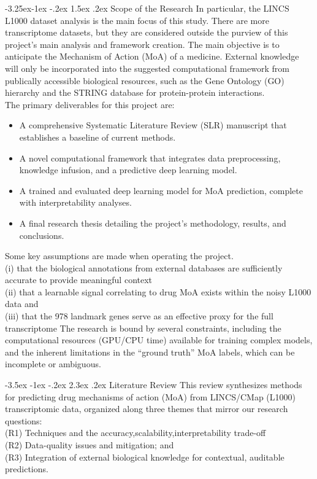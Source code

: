 \documentclass[12pt,a4paper]{article}
\makeatletter
\renewcommand\section{\@startsection{section}{1}{\z@}%
  {-3.5ex \@plus-1ex \@minus-.2ex}%
  {2.3ex \@plus.2ex}%
  {\normalfont\large\bfseries}}
\renewcommand\subsection{\@startsection{subsection}{2}{\z@}%
  {-3.25ex\@plus-1ex \@minus-.2ex}%
  {1.5ex \@plus.2ex}%
  {\normalfont\normalsize\bfseries}}
\makeatother
\begin{document}
\subsection{Scope of the Research}
In particular, the LINCS L1000 dataset analysis is the main focus of this study.  There are more transcriptome datasets, but they are considered outside the purview of this project's main analysis and framework creation. The main objective is to anticipate the Mechanism of Action (MoA) of a medicine.  External knowledge will only be incorporated into the suggested computational framework from publically accessible biological resources, such as the Gene Ontology (GO) hierarchy and the STRING database for protein-protein interactions.
\\
The primary deliverables for this project are:
\begin{itemize}
  \item A comprehensive Systematic Literature Review (SLR) manuscript that establishes a baseline of current methods.
  \item A novel computational framework that integrates data preprocessing, knowledge infusion, and a predictive deep learning model.
  \item A trained and evaluated deep learning model for MoA prediction, complete with interpretability analyses.
  \item A final research thesis detailing the project's methodology, results, and conclusions.
\end{itemize}
Some key assumptions are made when operating the project.\\
(i) that the biological annotations from external databases are sufficiently accurate to provide meaningful context\\ (ii) that a learnable signal correlating to drug MoA exists within the noisy L1000 data and\\(iii) that the 978 landmark genes serve as an effective proxy for the full transcriptome
The research is bound by several constraints, including the computational resources (GPU/CPU time) available for training complex models, and the inherent limitations in the \enquote{ground truth} MoA labels, which can be incomplete or ambiguous.

\section{Literature Review}
This review synthesizes methods for predicting drug mechanisms of action (MoA) from LINCS/CMap (L1000) transcriptomic data, organized along three themes that mirror our research questions: \\(R1) Techniques and the accuracy,scalability,interpretability trade-off \\ (R2) Data-quality issues and mitigation; and \\(R3) Integration of external biological knowledge for contextual, auditable predictions.
\end{document}
